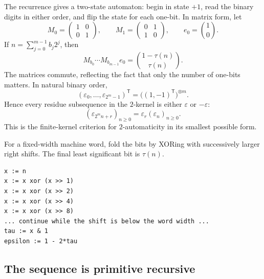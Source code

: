 \documentclass[11pt,oneside]{article}
\numberwithin{equation}{section}
\theoremstyle{definition}
\theoremstyle{remark}
\newcommand{\eps}{\varepsilon}
\begin{document}
The recurrence gives a two-state automaton: begin in state \(+1\), read the
binary digits in either order, and flip the state for each one-bit.  In matrix
form, let
\begin{equation}
  M_0=\begin{pmatrix}1&0\\0&1\end{pmatrix},
  \qquad
  M_1=\begin{pmatrix}0&1\\1&0\end{pmatrix},
  \qquad
  e_0=\binom10.
  \label{p1:eq:automaton-matrices}
\end{equation}
If \(n=\sum_{j=0}^{m-1}b_j2^j\), then
\begin{equation}
  M_{b_0}\cdots M_{b_{m-1}}e_0
  =\binom{1-\tau(n)}{\tau(n)}.
  \label{p1:eq:automaton-output}
\end{equation}
The matrices commute, reflecting the fact that only the number of one-bits
matters.  In natural binary order,
\begin{equation}
  (\eps_0,\ldots,\eps_{2^m-1})^{\mathsf T}
  =\bigl((1,-1)^{\mathsf T}\bigr)^{\otimes m}.
  \label{p1:eq:tensor-block}
\end{equation}
Hence every residue subsequence in the \(2\)-kernel is either \(\eps\) or
\(-\eps\):
\begin{equation}
  (\eps_{2^mn+r})_{n\ge0}=\eps_r(\eps_n)_{n\ge0}.
  \label{p1:eq:two-kernel}
\end{equation}
This is the finite-kernel criterion for \(2\)-automaticity in its smallest
possible form.

\begin{algorithm}
\label{p1:alg:xor-fold}
For a fixed-width machine word, fold the bits by XORing with successively
larger right shifts.  The final least significant bit is \(\tau(n)\).
\begin{lstlisting}[style=pseudo]
x := n
x := x xor (x >> 1)
x := x xor (x >> 2)
x := x xor (x >> 4)
x := x xor (x >> 8)
... continue while the shift is below the word width ...
tau := x & 1
epsilon := 1 - 2*tau
\end{lstlisting}
\end{algorithm}

\subsection{The sequence is primitive recursive}
\label{p1:sec:primitive-recursive}
\end{document}
